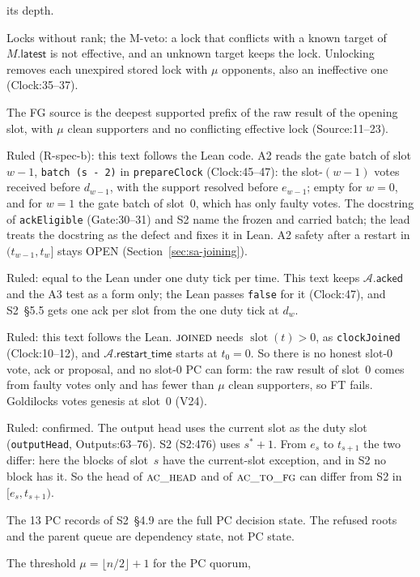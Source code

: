\documentclass{article}
\newcommand{\slot}{\operatorname{slot}}
\newcommand{\AC}{\mathcal A}
\newcommand{\restartTime}{\mathsf{restart\_time}}
\newcommand{\acked}{\mathsf{acked}}
\newcommand{\nm}[1]{\nolinkurl{#1}}
\begin{document}
\begin{description}
  its depth.
\item[S30] Locks without rank; the M-veto: a lock that conflicts with a
  known target of $M.\mathsf{latest}$ is not effective, and an unknown
  target keeps the lock.  Unlocking removes each unexpired stored lock
  with $\mu$ opponents, also an ineffective one (Clock:35--37).
\item[S31] The FG source is the deepest supported prefix of the raw result
  of the opening slot, with $\mu$ clean supporters and no conflicting
  effective lock (Source:11--23).
\item[S32] Ruled (R-spec-b): this text follows the Lean code.  A2 reads
  the gate batch of slot $w-1$, \nm{batch (s - 2)} in \nm{prepareClock}
  (Clock:45--47): the slot-$(w-1)$ votes received before $d_{w-1}$, with
  the support resolved before $e_{w-1}$; empty for $w=0$, and for $w=1$
  the gate batch of slot~0, which has only faulty votes.  The
  docstring of \nm{ackEligible} (Gate:30--31) and S2 name the frozen and
  carried batch; the lead treats the docstring as the defect and fixes it
  in Lean.  A2 safety after a restart in $(t_{w-1},t_w]$ stays OPEN
  (Section~\ref{sec:sa-joining}).
\item[S33] Ruled: equal to the Lean under one duty tick per time.  This
  text keeps $\AC.\acked$ and the A3 test as a form only; the Lean passes
  \nm{false} for it (Clock:47), and S2~\S5.5 gets one ack per slot from the
  one duty tick at $d_w$.
\item[S34] Ruled: this text follows the Lean.  $\Call{joined}{}$ needs
  $\slot(t)>0$, as \nm{clockJoined} (Clock:10--12), and
  $\AC.\restartTime$ starts at $t_0=0$.  So there is no honest slot-0
  vote, ack or proposal, and no slot-0 PC can form: the raw result of
  slot~0 comes from faulty votes only and has fewer than $\mu$ clean
  supporters, so FT fails.  Goldilocks votes genesis at slot~0 (V24).
\item[S35] Ruled: confirmed.  The output head uses the current slot as
  the duty slot (\nm{outputHead}, Outputs:63--76).  S2 (S2:476) uses
  $s^*+1$.  From $e_s$ to $t_{s+1}$ the two differ: here the blocks of
  slot~$s$ have the current-slot exception, and in S2 no block has it.  So
  the head of $\Call{ac\_head}{}$ and of $\Call{ac\_to\_fg}{}$ can differ
  from S2 in $[e_s,t_{s+1})$.
\item[S36] The 13 PC records of S2~\S4.9 are the full PC decision state.
  The refused roots and the parent queue are dependency state, not PC
  state.
\item[S37] The threshold $\mu=\lfloor n/2\rfloor+1$ for the PC quorum,

\end{description}
\end{document}
